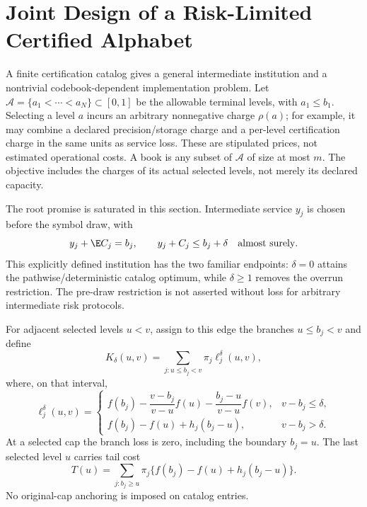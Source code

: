 \section{Joint Design of a Risk-Limited Certified Alphabet}\label{sec:catalog}
A finite certification catalog gives a general intermediate institution and a nontrivial codebook-dependent implementation problem. Let $\mathcal A=\{a_1<\cdots<a_N\}\subset[0,1]$ be the allowable terminal levels, with $a_1\leq b_1$. Selecting a level $a$ incurs an arbitrary nonnegative charge $\rho(a)$; for example, it may combine a declared precision/storage charge and a per-level certification charge in the same units as service loss. These are stipulated prices, not estimated operational costs. A book is any subset of $\mathcal A$ of size at most $m$. The objective includes the charges of its actual selected levels, not merely its declared capacity.

The root promise is saturated in this section. Intermediate service $y_j$ is chosen before the symbol draw, with
\begin{equation}\label{eq:r37-overrun}
 y_j+\E C_j=b_j,\qquad y_j+C_j\leq b_j+\delta\quad\text{almost surely}.
\end{equation} This explicitly defined institution has the two familiar endpoints: $\delta=0$ attains the pathwise/deterministic catalog optimum, while $\delta\geq1$ removes the overrun restriction. The pre-draw restriction is not asserted without loss for arbitrary intermediate risk protocols.

For adjacent selected levels $u<v$, assign to this edge the branches $u\leq b_j<v$ and define
\begin{equation}\label{eq:catalog-edge}
 K_\delta(u,v)=\sum_{j:u\leq b_j<v}\pi_j\ell_j^\delta(u,v),
\end{equation}
where, on that interval,
\begin{equation}\label{eq:catalog-loss}
 \ell_j^\delta(u,v)=
 \begin{cases}
 f(b_j)-\dfrac{v-b_j}{v-u}f(u)-\dfrac{b_j-u}{v-u}f(v),&v-b_j\leq\delta,\\[4pt]
 f(b_j)-f(u)+h_j(b_j-u),&v-b_j>\delta.
 \end{cases}
\end{equation}
At a selected cap the branch loss is zero, including the boundary $b_j=u$. The last selected level $u$ carries tail cost
\begin{equation}\label{eq:catalog-tail}
 T(u)=\sum_{j:b_j\geq u}\pi_j\{f(b_j)-f(u)+h_j(b_j-u)\}.
\end{equation}
No original-cap anchoring is imposed on catalog entries.

